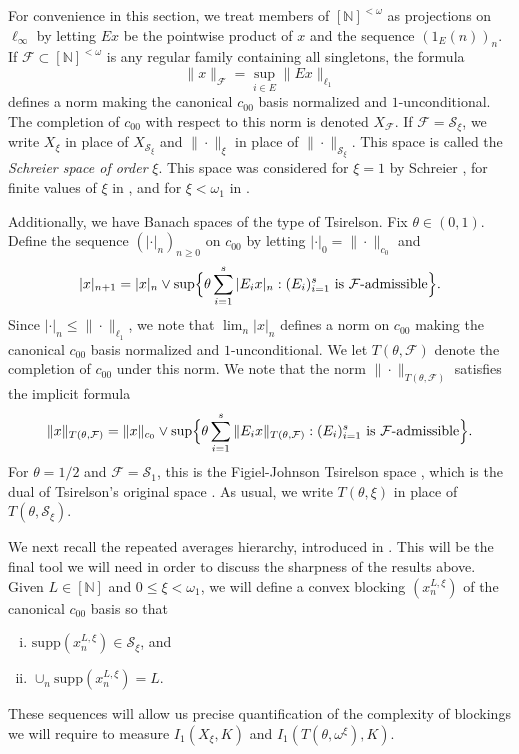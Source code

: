 \documentclass[12pt]{amsart}
\theoremstyle{definition}
\newcommand{\fin}{[\mathbb{N}]^{<\omega}}
\newcommand{\infin}{[\mathbb{N}]}
\newcommand{\fff}{\mathcal{F}}
\newcommand{\sss}{\mathcal{S}}
\newcommand{\supp}{\mathrm{supp}}
\begin{document}
For convenience in this section, we treat members of $\fin$ as projections on $\ell_\infty$ by letting $Ex$ be the pointwise product of $x$ and the sequence $(1_E(n))_n$.  
If $\fff\subset \fin$ is any regular family containing all singletons, the formula $$\|x\|_\fff=\sup_{i\in E}\|Ex\|_{\ell_1}$$ defines a norm making the canonical $c_{00}$ basis normalized and $1$-unconditional.  The completion of $c_{00}$ with respect to this norm is denoted $X_\fff$.  If $\fff=\sss_\xi$, we write $X_\xi$ in place of $X_{\sss_\xi}$ and $\|\cdot\|_\xi$ in place of $\|\cdot\|_{\sss_\xi}$.  This space is called the \emph{Schreier space of order} $\xi$.  This space was considered for $\xi=1$ by Schreier \cite{Schreier}, for finite values of $\xi$ in \cite{AO}, and for $\xi<\omega_1$ in \cite{AA}.  

Additionally, we have Banach spaces of the type of Tsirelson.  Fix $\theta\in (0,1)$. Define the sequence $(|\cdot|_n)_{n\geqslant 0}$ on $c_{00}$ by letting $|\cdot|_0=\|\cdot\|_{c_0}$ and $$|x|_{n+1}= |x|_n \vee \sup \Bigl\{ \theta \sum_{i=1}^s |E_i x|_n: (E_i)_{i=1}^s \text{\ is\ }\fff\text{-admissible}\Bigr\}.$$  Since $|\cdot|_n\leqslant \|\cdot\|_{\ell_1}$, we note that $\lim_n |x|_n$ defines a norm on $c_{00}$ making the canonical $c_{00}$ basis normalized and $1$-unconditional.  We let $T(\theta, \fff)$ denote the completion of $c_{00}$ under this norm.  We note that the norm $\|\cdot\|_{T(\theta, \fff)}$ satisfies the implicit formula $$\|x\|_{T(\theta, \fff)} = \|x\|_{c_0}\vee \sup \Bigl\{\theta\sum_{i=1}^s \|E_i x\|_{T(\theta, \fff)}: (E_i)_{i=1}^s \text{\ is\ }\fff\text{-admissible}\Bigr\}.$$    For $\theta=1/2$ and $\fff=\sss_1$, this is the Figiel-Johnson Tsirelson space \cite{FJ}, which is the dual of Tsirelson's original space \cite{Tsirelson}. As usual, we write $T(\theta, \xi)$ in place of $T(\theta, \sss_\xi)$.    

We next recall the repeated averages hierarchy, introduced in \cite{AMT}. This will be the final tool we will need in order to discuss the sharpness of the results above.  Given $L\in \infin$ and $0\leqslant \xi<\omega_1$, we will define a convex blocking $(x_n^{L, \xi})$ of the canonical $c_{00}$ basis so that \begin{enumerate}[(i)]\item $\supp(x_n^{L, \xi})\in \sss_\xi$, and \item $\cup_n \supp(x_n^{L, \xi})=L$. \end{enumerate} These sequences will allow us precise quantification of the complexity of blockings we will require to measure $I_1(X_\xi, K)$ and $I_1(T(\theta, \omega^\xi), K)$.  
\end{document}

